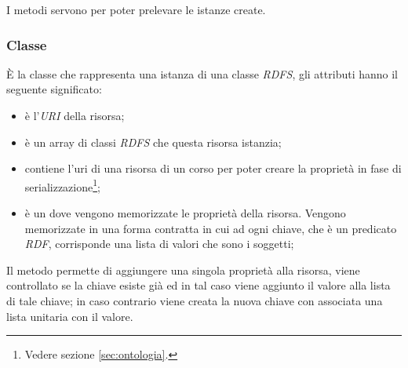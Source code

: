 \documentclass[tesi.tex]{subfiles}
\begin{document}
I metodi  servono per poter prelevare le istanze create.

\subsubsection{Classe }
\begin{center}
\end{center}
\`E la classe che rappresenta una istanza di una classe \emph{RDFS},
gli attributi hanno il seguente significato:
\begin{itemize}
\item {} \`e l'\emph{URI} della risorsa;
\item {} \`e un array di classi \emph{RDFS} che questa
  risorsa istanzia;
\item {} contiene l'uri di una risorsa di un
  corso per poter creare la propriet\`a  in fase di
  serializzazione\footnote{Vedere sezione \ref{sec:ontologia}.};
\item {} \`e un  dove vengono
  memorizzate le propriet\`a della risorsa. Vengono memorizzate in una
  forma contratta in cui ad ogni chiave, che \`e un predicato
  \emph{RDF}, corrisponde una lista di valori che sono i soggetti;
\end{itemize}

Il metodo  permette di aggiungere una singola
propriet\`a alla risorsa, viene controllato se la chiave esiste gi\`a ed
in tal caso viene aggiunto il valore alla lista di tale chiave; in
caso contrario viene creata la nuova chiave con associata una lista
unitaria con il valore.
\end{document}
